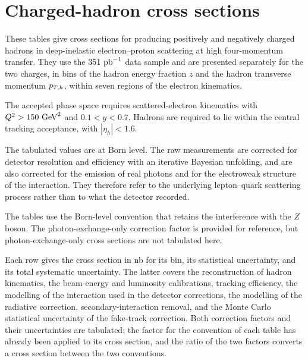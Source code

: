 \section{Charged-hadron cross sections}
\label{app:born-xsec-tables}

\begingroup\sloppy{}

These tables give cross sections for producing positively and negatively charged
hadrons in deep-inelastic electron--proton scattering at high four-momentum
transfer.  They use the $351~\text{pb}^{-1}$ data sample and are presented separately
for the two charges, in bins of the hadron energy fraction $z$ and the hadron
transverse momentum $p_{T,h}$, within seven regions of the electron kinematics.

The accepted phase space requires scattered-electron kinematics with
$Q^{2} > 150~\text{GeV}^{2}$ and $0.1 < y < 0.7$.  Hadrons are required to lie within
the central tracking acceptance, with $|\eta_h| < 1.6$.

The tabulated values are at Born level.  The raw measurements are corrected for
detector resolution and efficiency with an iterative Bayesian unfolding, and are
also corrected for the emission of real photons and for the electroweak
structure of the interaction.  They therefore refer to the underlying
lepton--quark scattering process rather than to what the detector recorded.

The tables use the Born-level convention that retains the interference with
the $Z$ boson.  The photon-exchange-only correction factor is provided for
reference, but photon-exchange-only cross sections are not tabulated here.

Each row gives the cross section in nb for its bin, its statistical uncertainty,
and its total systematic uncertainty.  The latter covers the reconstruction of
hadron kinematics, the beam-energy and luminosity calibrations, tracking
efficiency, the modelling of the interaction used in the detector corrections,
the modelling of the radiative correction, secondary-interaction removal, and
the Monte Carlo statistical uncertainty of the fake-track correction.  Both correction factors and their uncertainties are tabulated; the factor for
the convention of each table has already been applied to its cross section, and
the ratio of the two factors converts a cross section between the two conventions.

